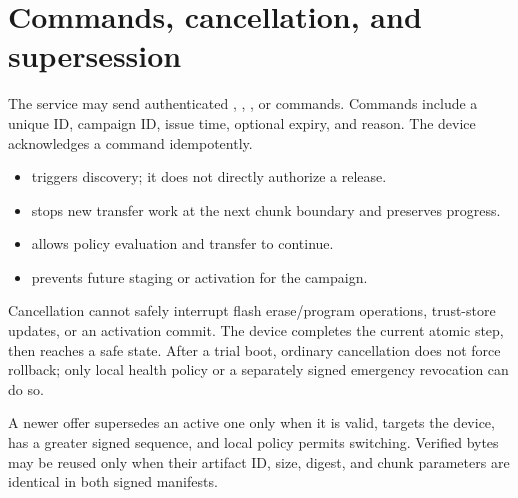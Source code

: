 \section{Commands, cancellation, and supersession}

The service may send authenticated , , , or
 commands. Commands include a unique ID, campaign ID, issue time,
optional expiry, and reason. The device acknowledges a command idempotently.

\begin{itemize}
  \item {} triggers discovery; it does not directly authorize a release.
  \item {} stops new transfer work at the next chunk boundary and preserves progress.
  \item {} allows policy evaluation and transfer to continue.
  \item {} prevents future staging or activation for the campaign.
\end{itemize}

Cancellation cannot safely interrupt flash erase/program operations, trust-store
updates, or an activation commit. The device completes the current atomic step,
then reaches a safe state. After a trial boot, ordinary cancellation does not
force rollback; only local health policy or a separately signed emergency
revocation can do so.

A newer offer supersedes an active one only when it is valid, targets the device,
has a greater signed sequence, and local policy permits switching. Verified bytes
may be reused only when their artifact ID, size, digest, and chunk parameters are
identical in both signed manifests.

